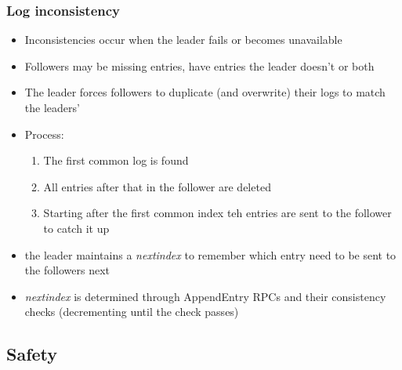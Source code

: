 \documentclass[10pt,a4paper]{article}
\begin{document}
	\subsubsection{Log inconsistency}
	\begin{itemize}
		\item Inconsistencies occur when the leader fails or becomes unavailable
		\item Followers may be missing entries, have entries the leader doesn't or both
		\item The leader forces followers to duplicate (and overwrite) their logs to match the leaders'
		\item Process:
		\begin{enumerate}
			\item The first common log is found
			\item All entries after that in the follower are deleted
			\item Starting after the first common index teh entries are sent to the follower to catch it up
		\end{enumerate}
		\item the leader maintains a \textit{nextindex} to remember which entry need to be sent to the followers next
		\item \textit{nextindex} is determined through AppendEntry RPCs and their consistency checks (decrementing until the check passes)
		
	\end{itemize}


	\subsection{Safety}
\end{document}
